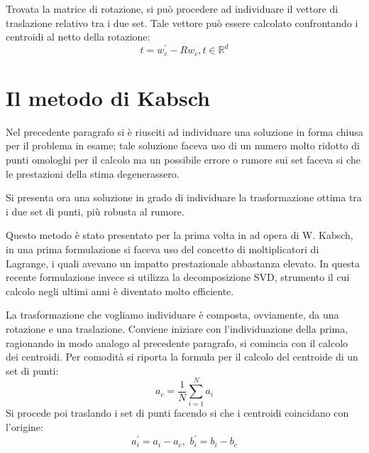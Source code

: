 Trovata la matrice di rotazione, si può procedere ad individuare il vettore di traslazione relativo tra i due set. Tale vettore può essere calcolato confrontando i centroidi al netto della rotazione:
\begin{equation}
t = w_c^{'} - Rw_c, t \in \mathbb{R}^d
\end{equation}

\section{Il metodo di Kabsch}
\label{sec:kabsch}

Nel precedente paragrafo si è riusciti ad individuare una soluzione in forma chiusa per il problema in esame; tale soluzione faceva uso di un numero molto ridotto di punti omologhi per il calcolo ma un possibile errore o rumore sui set faceva si che le prestazioni della stima degenerassero.

Si presenta ora una soluzione in grado di individuare la trasformazione ottima tra i due set di punti, più robusta al rumore.

Questo metodo è stato presentato per la prima volta in \cite{bib1} ad opera di W. Kabsch, in una prima formulazione si faceva uso del concetto di moltiplicatori di Lagrange, i quali avevano un impatto prestazionale abbastanza elevato. In questa recente formulazione invece si utilizza la decomposizione SVD, strumento il cui calcolo negli ultimi anni è diventato molto efficiente.

La trasformazione che vogliamo individuare è composta, ovviamente, da una rotazione e una traslazione. Conviene iniziare con l'individuazione della prima, ragionando in modo analogo al precedente paragrafo, si comincia con il calcolo dei centroidi. Per comodità si riporta la formula per il calcolo del centroide di un set di punti:
\begin{equation}
	\label{rot:eq:cent}
	a_c = \frac{1}{N}\sum_{i = 1}^{N}a_i
\end{equation}
Si procede poi traslando i set di punti facendo si che i centroidi coincidano con l'origine:
\begin{equation}
\label{rot:eq:redef}
a_i^{'} = a_i - a_c, \, \, 
b_i^{'} = b_i - b_c
\end{equation}

